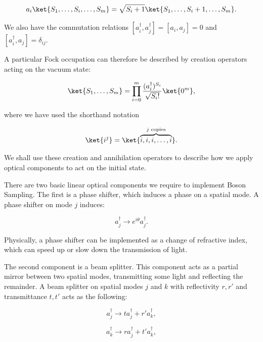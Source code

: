 \begin{equation}
a_i\ket{S_1,\dots,S_i,\dots,S_m} = \sqrt{S_i+1}\ket{S_1,\dots,S_i+1,\dots,S_m}.
\end{equation}

\noindent We also have the commutation relations $[a_i^\dagger, a_j^\dagger] = [a_i,a_j] = 0$ and $[a_i^\dagger, a_j] = \delta_{ij}$.

A particular Fock occupation can therefore be described by creation operators acting on the vacuum state:

\begin{equation}
\ket{S_1,\dots,S_m} = \prod_{i=0}^m\frac{(a_i^\dagger)^{S_i}}{\sqrt{S_i!}}\ket{0^m},
\end{equation}

\noindent where we have used the shorthand notation

\begin{equation}
\ket{i^j} = \ket{\overbrace{i,i,i,\dots,i}^{j \textrm{ copies}}}.
\end{equation}

\noindent We shall use these creation and annihilation operators to describe how we apply optical components to act on the initial state.

There are two basic linear optical components we require to implement Boson Sampling. The first is a phase shifter, which induces a phase on a spatial mode. A phase shifter on mode $j$ induces:

\begin{equation}
a_j^\dagger \rightarrow e^{i\theta}a_j^\dagger.
\end{equation}

Physically, a phase shifter can be implemented as a change of refractive index, which can speed up or slow down the transmission of light.

The second component is a beam splitter. This component acts as a partial mirror between two spatial modes, transmitting some light and reflecting the remainder. A beam splitter on spatial modes $j$ and $k$ with reflectivity $r, r'$ and transmittance $t, t'$ acts as the following:

\begin{equation}
a_j^\dagger \rightarrow ta_j^\dagger + r'a_k^\dagger,
\end{equation}

\begin{equation}
a_k^\dagger \rightarrow ra_j^\dagger + t'a_k^\dagger,
\end{equation}

